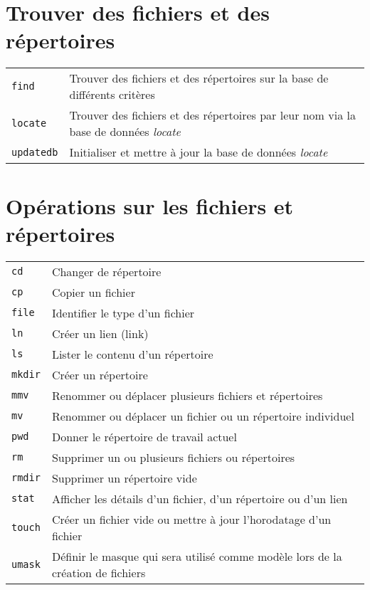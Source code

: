 \documentclass[10pt,a4paper]{article}
\begin{document}
\begin{multicols}{2}
\vfill

\section{Trouver des fichiers et des répertoires}
\begin{tabular}{ p{2.5cm} p{8.5cm} }
  \hline
  \texttt{find} & Trouver des fichiers et des répertoires sur la base de différents critères \\
  \rowcolor{Gray}
  \texttt{locate} &  Trouver des fichiers et des répertoires par leur nom via la base de données \textit{locate}\\
  \texttt{updatedb} & Initialiser et mettre à jour la base de données \textit{locate}\\
  \hline
\end{tabular}

\columnbreak

\section{Opérations sur les fichiers et répertoires}
\begin{tabular}{ p{2.5cm} p{8.5cm} }
  \hline
  \texttt{cd} & Changer de répertoire \\
  \rowcolor{Gray}
  \texttt{cp} & Copier un fichier \\
  \texttt{file} & Identifier le type d'un fichier\\
  \rowcolor{Gray}
  \texttt{ln} & Créer un lien (link)\\
  \texttt{ls} & Lister le contenu d'un répertoire\\
  \rowcolor{Gray}
  \texttt{mkdir} & Créer un répertoire\\
  \texttt{mmv} & Renommer ou déplacer plusieurs fichiers et répertoires \\
  \rowcolor{Gray}
  \texttt{mv} & Renommer ou déplacer un fichier ou un répertoire individuel \\
  \texttt{pwd} & Donner le répertoire de travail actuel \\
  \rowcolor{Gray}
  \texttt{rm} & Supprimer un ou plusieurs fichiers ou répertoires \\
  \texttt{rmdir} & Supprimer un répertoire vide \\
  \rowcolor{Gray}
  \texttt{stat} & Afficher les détails d'un fichier, d'un répertoire ou d'un lien \\
  \texttt{touch} & Créer un fichier vide ou mettre à jour l'horodatage d'un fichier \\
  \rowcolor{Gray}
  \texttt{umask} & Définir le masque qui sera utilisé comme modèle lors de la création de fichiers\\
  \hline
\end{tabular}


\end{multicols}
\end{document}

